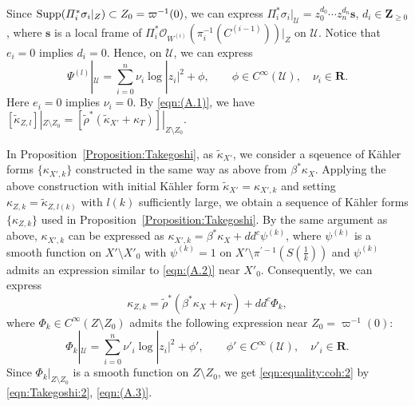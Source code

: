 \documentclass[amscd, leqno]{amsart}
\theoremstyle{plain}
\theoremstyle{definition}
\theoremstyle{remark}
\begin{document}
Since ${\rm Supp}(\varPi_{i}^{*}\sigma_{i}|_{Z}) \subset Z_{0}=\varpi^{-1}(0)$, we can express
$\varPi_{i}^{*}\sigma_{i}|_{\mathcal U} = z_{0}^{d_{0}} \cdots z_{n}^{d_{n}}{\mathbf s}$, $d_{i}\in{\mathbf Z}_{\geq0}$, 
where ${\mathbf s}$ is a local frame of $\varPi_{i}^{*}{\mathcal O}_{W^{(i)}}(\pi_{i}^{-1}(C^{(i-1)}))|_{Z}$ on ${\mathcal U}$.
Notice that $e_{i}=0$ implies $d_{i}=0$. Hence, on ${\mathcal U}$, we can express
\begin{equation}
\label{eqn:(A.2)}
\Psi^{(l)} |_{\mathcal U} = \sum_{i=0}^{n}\nu_{i}\log|z_{i}|^{2}+\phi,
\qquad
\phi\in C^{\infty}({\mathcal U}),
\quad
\nu_{i}\in{\mathbf R}.
\end{equation}
Here $e_{i}=0$ implies $\nu_{i}=0$. 
By \eqref{eqn:(A.1)}, we have 
$[ \widetilde{\kappa}_{Z,l} ] |_{Z\setminus Z_{0}} = [ \widetilde{\rho}^{*}(\widetilde{\kappa}_{X'} + \kappa_{T} ) ] |_{Z\setminus Z_{0}}$.

\medskip
\par
In Proposition~\ref{Proposition:Takegoshi}, as $\widetilde{\kappa}_{X'}$, we consider a sqeuence of K\"ahler forms
$\{ \kappa_{X',k} \}$ constructed in the same way as above from $\beta^{*}\kappa_{X}$. Applying the above construction with
initial K\"ahler form $\widetilde{\kappa}_{X'} = \kappa_{X',k}$ and setting $\kappa_{Z,k} = \widetilde{\kappa}_{Z,l(k)}$ with
$l(k)$ sufficiently large, we obtain a sequence of K\"ahler forms $\{ \kappa_{Z,k} \}$ used in Proposition~\ref{Proposition:Takegoshi}.
By the same argument as above, $\kappa_{X',k}$ can be expressed as $\kappa_{X',k} = \beta^{*}\kappa_{X} + dd^{c}\psi^{(k)}$, 
where $\psi^{(k)}$ is a smooth function on $X'\setminus X'_{0}$ with $\psi^{(k)}=1$ on $X'\setminus \pi^{\prime -1}(S(\frac{1}{k}))$ 
and $\psi^{(k)}$ admits an expression similar to \eqref{eqn:(A.2)} near $X'_{0}$. Consequently, we can express
\begin{equation}
\label{eqn:(A.3)}
\kappa_{Z,k} = \widetilde{\rho}^{*}( \beta^{*} \kappa_{X} + \kappa_{T} ) + dd^{c} \Phi_{k},
\end{equation}
where $\Phi_{k} \in C^{\infty}(Z \setminus Z_{0})$ admits the following expression near $Z_{0} = \varpi^{-1}(0)$:
\begin{equation}
\label{eqn:(A.4)}
\Phi_{k} |_{\mathcal U} = \sum_{i=0}^{n}\nu'_{i}\log|z_{i}|^{2} + \phi',
\qquad
\phi' \in C^{\infty}({\mathcal U}),
\quad
\nu'_{i}\in{\mathbf R}.
\end{equation}
Since $\Phi_{k} |_{Z\setminus Z_{0}}$ is a smooth function on $Z\setminus Z_{0}$, 
we get \eqref{eqn:equality:coh:2} by \eqref{eqn:Takegoshi:2}, \eqref{eqn:(A.3)}.
\end{document}
